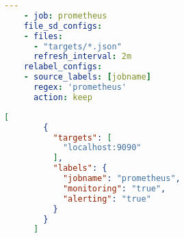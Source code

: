 \begin{multicols}{2}
    \begin{lstlisting}[language=yaml,frame=single,caption={Usando file\_sd\_configs:},label={lst:file_sd_prom.yml}]
    ---
    - job: prometheus
    file_sd_configs:
    - files:
      - "targets/*.json"
      refresh_interval: 2m
    relabel_configs:
    - source_labels: [jobname]
      regex: 'prometheus'
      action: keep
    \end{lstlisting}
    \columnbreak
    \begin{lstlisting}[language=json,frame=single,caption={Especificación de targets en JSON:},label={lst:targets.json}]
      [
        {
          "targets": [
            "localhost:9090"
          ],
          "labels": {
            "jobname": "prometheus",
            "monitoring": "true",
            "alerting": "true"
          }
        }
      ]
      \end{lstlisting}
    \end{multicols}